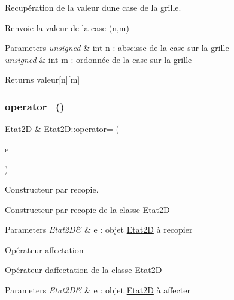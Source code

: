 Recupération de la valeur d\textquotesingle{}une case de la grille. 

Renvoie la valeur de la case (n,m)


\begin{DoxyParams}{Parameters}
{\em unsigned} & int n \+: abscisse de la case sur la grille \\
\hline
{\em unsigned} & int m \+: ordonnée de la case sur la grille \\
\hline
\end{DoxyParams}
\begin{DoxyReturn}{Returns}
valeur\mbox{[}n\mbox{]}\mbox{[}m\mbox{]} 
\end{DoxyReturn}
\mbox{\label{class_etat2_d_a209b78aae297b6926e1c0450e19c1a89}} 
\subsubsection{\texorpdfstring{operator=()}{operator=()}}
{\footnotesize\ttfamily \mbox{\hyperlink{class_etat2_d}{Etat2D}} \& Etat2\+D\+::operator= (\begin{DoxyParamCaption}\item[{const \mbox{\hyperlink{class_etat2_d}{Etat2D}} \&}]{e }\end{DoxyParamCaption})}



Constructeur par recopie. 

Constructeur par recopie de la classe \mbox{\hyperlink{class_etat2_d}{Etat2D}}


\begin{DoxyParams}{Parameters}
{\em Etat2\+D\&} & e \+: objet \mbox{\hyperlink{class_etat2_d}{Etat2D}} à recopier\\
\hline
\end{DoxyParams}
Opérateur affectation

Opérateur d\textquotesingle{}affectation de la classe \mbox{\hyperlink{class_etat2_d}{Etat2D}}


\begin{DoxyParams}{Parameters}
{\em Etat2\+D\&} & e \+: objet \mbox{\hyperlink{class_etat2_d}{Etat2D}} à affecter \\
\hline
\end{DoxyParams}
\mbox{\label{class_etat2_d_ab19cb72ec4d46d96bd41038b84176797}} 
